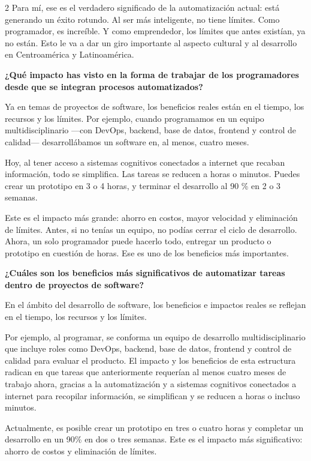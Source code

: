 \documentclass[12pt,spanish,Letterpaper,openany]{book}
\begin{document}
\begin {multicols}{2}
Para mí, ese es el verdadero significado de la automatización actual: está generando un éxito rotundo. Al ser más inteligente, no tiene límites. Como programador, es increíble. Y como emprendedor, los límites que antes existían, ya no están. Esto le va a dar un giro importante al aspecto cultural y al desarrollo en Centroamérica y Latinoamérica.

\textbf{¿Qué impacto has visto en la forma de trabajar de los programadores desde que se integran procesos automatizados?}

Ya en temas de proyectos de software, los beneficios reales están en el tiempo, los recursos y los límites. Por ejemplo, cuando programamos en un equipo multidisciplinario ---con DevOps, backend, base de datos, frontend y control de calidad--- desarrollábamos un software en, al menos, cuatro meses.

Hoy, al tener acceso a sistemas cognitivos conectados a internet que recaban información, todo se simplifica. Las tareas se reducen a horas o minutos. Puedes crear un prototipo en 3 o 4 horas, y terminar el desarrollo al 90 \% en 2 o 3 semanas.

Este es el impacto más grande: ahorro en costos, mayor velocidad y eliminación de límites. Antes, si no tenías un equipo, no podías cerrar el ciclo de desarrollo. Ahora, un solo programador puede hacerlo todo, entregar un producto o prototipo en cuestión de horas. Ese es uno de los beneficios más importantes.

\textbf{¿Cuáles son los beneficios más significativos de automatizar tareas dentro de proyectos de software?}

En el ámbito del desarrollo de software, los beneficios e impactos reales se reflejan en el tiempo, los recursos y los límites.

Por ejemplo, al programar, se conforma un equipo de desarrollo multidisciplinario que incluye roles como DevOps, backend, base de datos, frontend y control de calidad para evaluar el producto. El impacto y los beneficios de esta estructura radican en que tareas que anteriormente requerían al menos cuatro meses de trabajo ahora, gracias a la automatización y a sistemas cognitivos conectados a internet para recopilar información, se simplifican y se reducen a horas o incluso minutos.

Actualmente, es posible crear un prototipo en tres o cuatro horas y completar un desarrollo en un 90\% en dos o tres semanas. Este es el impacto más significativo: ahorro de costos y eliminación de límites.


\end{multicols}
\end{document}
